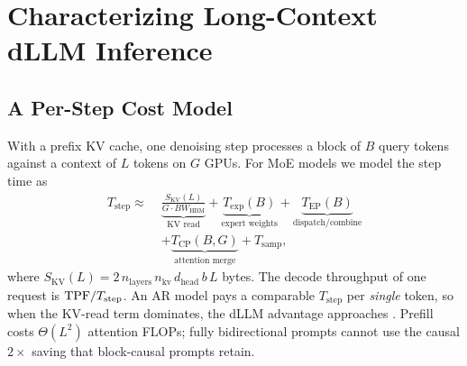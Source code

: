 \section{Characterizing Long-Context dLLM Inference}
\label{sec:char}

\subsection{A Per-Step Cost Model}
With a prefix KV cache, one denoising step processes a block of $B$ query tokens against a context of
$L$ tokens on $G$ GPUs. For MoE models we model the step time as
\begin{equation}
\begin{split}
T_{\text{step}} \approx\;&
\underbrace{\frac{S_{\text{KV}}(L)}{G\cdot BW_{\text{HBM}}}}_{\text{KV read}} +
\underbrace{T_{\text{exp}}(B)}_{\text{expert weights}} +
\underbrace{T_{\text{EP}}(B)}_{\text{dispatch/combine}} \\
&+ \underbrace{T_{\text{CP}}(B, G)}_{\text{attention merge}} + T_{\text{samp}},
\end{split}
\label{eq:step}
\end{equation}
where $S_{\text{KV}}(L) = 2\,n_{\text{layers}}\,n_{\text{kv}}\,d_{\text{head}}\,b\,L$ bytes. The
decode throughput of one request is $\mathrm{TPF} / T_{\text{step}}$. An AR model pays a comparable
$T_{\text{step}}$ per \emph{single} token, so when the KV-read term dominates, the dLLM advantage
approaches \TPF. Prefill costs $\Theta(L^2)$ attention FLOPs; fully bidirectional prompts cannot use
the causal $2\times$ saving that block-causal prompts retain.

\begin{table}[t]
\caption{KV-cache footprint from model configurations (BF16). Block-diffusion LLaDA2.x models and
their AR counterparts (Ling 2.0) share identical shapes.}
\label{tab:kv}
\centering\small
{}
\end{table}

